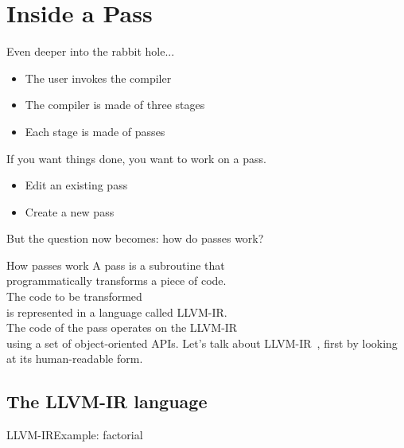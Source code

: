 
\section{Inside a Pass}


\begin{frame}{Even deeper into the rabbit hole...}
\begin{itemize}
\item The \alert{user} invokes the \alert{compiler}
\item The \alert{compiler} is made of three \alert{stages}
\item Each \alert{stage} is made of \alert{passes}
\end{itemize}
\medskip
If you want things done, you want to work on a \alert{pass}.\\
\medskip
\begin{itemize}
\item Edit an existing pass
\item Create a new pass
\end{itemize}
\medskip
But the question now becomes: how do passes work?
\end{frame}


\begin{frame}{How passes work}
\centering
A \alert{pass} is a \alert{subroutine} that \\programmatically
transforms a piece of code.\\
\bigskip
The code to be transformed \\is represented in a language 
called \alert{LLVM-IR}.\\
\bigskip
The code of the pass operates on the LLVM-IR \\using a set of
\alert{object-oriented APIs}.
\vfill
Let's talk about LLVM-IR~\cite{LOCAL:www/llvmLanguageRef}, 
first by looking at its \alert{human-readable} form.
\end{frame}


\subsection{The LLVM-IR language}


\begin{frame}{LLVM-IR}{Example: factorial}
\begin{center}
\begin{varwidth}{20cm}
\llvminput[\ttfamily\fontsize{7pt}{5pt}\selectfont]{snippet/fact.ll}
\end{varwidth}
\end{center}
\end{frame}


